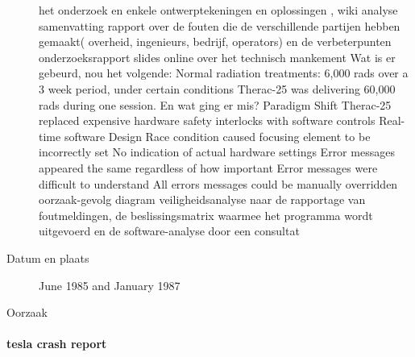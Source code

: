 \begin{description}
	het onderzoek en enkele ontwerptekeningen en oplossingen
	\cite{statsenko10102016Therackillerbug}
	\cite{therac25casestudy}
	\cite{thomas1994theracinLotos},
	\cite{twitter2019programmerbehindtherac}
	wiki
	\cite{wikibookstherac}
	analyse
	\cite{bozdagTherac25}
	samenvatting
	\cite{levesonTurnerTheracAbstract}
	rapport over de fouten die de verschillende partijen hebben gemaakt( overheid, ingenieurs, bedrijf, operators) en de verbeterpunten
	onderzoeksrapport
	slides online over het technisch mankement
	Wat is er gebeurd, nou het volgende:
	Normal radiation treatments: 6,000 rads over a 3 week period, under certain conditions Therac-25 was delivering 60,000 rads during one session.
	En wat ging er mis?
	Paradigm Shift
	Therac-25 replaced expensive hardware safety interlocks with software controls
	Real-time software
	Design
	Race condition caused focusing element to be incorrectly set
	No indication of actual hardware settings
	Error messages appeared the same regardless of how important
	Error messages were difficult to understand
	All errors messages could be manually overridden
	oorzaak-gevolg diagram
	veiligheidsanalyse naar de rapportage van foutmeldingen, de beslissingsmatrix waarmee het programma wordt uitgevoerd en de software-analyse door een consultat
	\cite{stackexchange2021therac25code}
	
	\item[Datum en plaats] 
	June 1985 and January 1987
	\item[Oorzaak]
\end{description}






\paragraph{tesla crash report}

